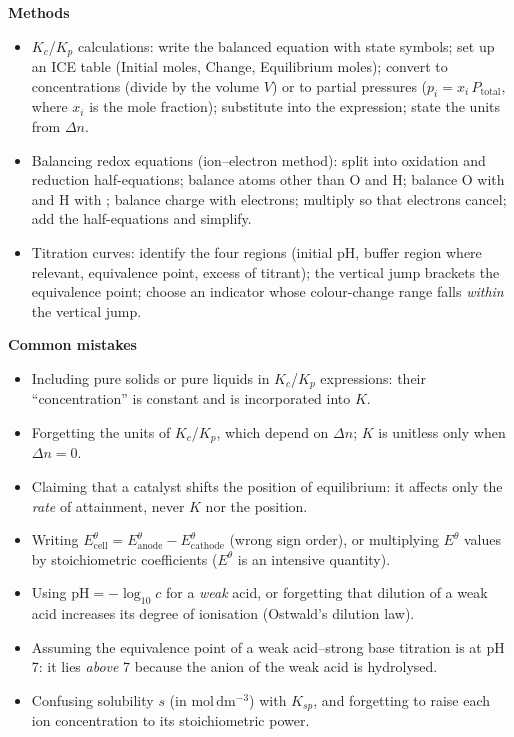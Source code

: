 \documentclass[11pt]{article}
\begin{document}
\begin{bilan}
\textbf{Methods}
\begin{itemize}
\item $K_c$/$K_p$ calculations: write the balanced equation with state symbols; set up an ICE table (Initial moles, Change, Equilibrium moles); convert to concentrations (divide by the volume $V$) or to partial pressures ($p_i=x_i\,P_{\text{total}}$, where $x_i$ is the mole fraction); substitute into the expression; state the units from $\Delta n$.
\item Balancing redox equations (ion--electron method): split into oxidation and reduction half-equations; balance atoms other than O and H; balance O with  and H with ; balance charge with electrons; multiply so that electrons cancel; add the half-equations and simplify.
\item Titration curves: identify the four regions (initial pH, buffer region where relevant, equivalence point, excess of titrant); the vertical jump brackets the equivalence point; choose an indicator whose colour-change range falls \emph{within} the vertical jump.
\end{itemize}

\textbf{Common mistakes}
\begin{itemize}
\item Including pure solids or pure liquids in $K_c$/$K_p$ expressions: their ``concentration'' is constant and is incorporated into $K$.
\item Forgetting the units of $K_c$/$K_p$, which depend on $\Delta n$; $K$ is unitless only when $\Delta n=0$.
\item Claiming that a catalyst shifts the position of equilibrium: it affects only the \emph{rate} of attainment, never $K$ nor the position.
\item Writing $E^\theta_{\text{cell}}=E^\theta_{\text{anode}}-E^\theta_{\text{cathode}}$ (wrong sign order), or multiplying $E^\theta$ values by stoichiometric coefficients ($E^\theta$ is an intensive quantity).
\item Using $\mathrm{pH}=-\log_{10} c$ for a \emph{weak} acid, or forgetting that dilution of a weak acid increases its degree of ionisation (Ostwald's dilution law).
\item Assuming the equivalence point of a weak acid--strong base titration is at pH 7: it lies \emph{above} 7 because the anion of the weak acid is hydrolysed.
\item Confusing solubility $s$ (in $\mathrm{mol\,dm^{-3}}$) with $K_{sp}$, and forgetting to raise each ion concentration to its stoichiometric power.
\end{itemize}


\end{bilan}
\end{document}

